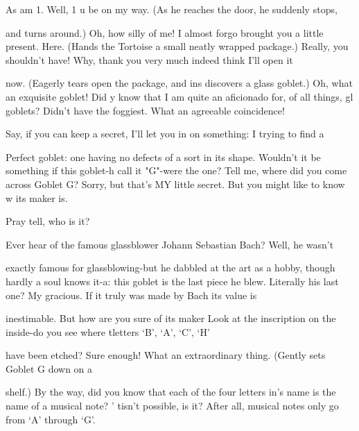 \achilles As am 1. Well, 1 u be on my way. (As he reaches the door, he suddenly stops,\par
and turns around.) Oh, how silly of me! I almost forgo brought you a little present. Here. (Hands the Tortoise a small neatly wrapped package.) 
\tortoise Really, you shouldn't have! Why, thank you very much indeed think I'll open it\par
now. (Eagerly tears open the package, and ins discovers a glass goblet.) Oh, what an exquisite goblet! Did y know that I am quite an aficionado for, of all things, gl goblets? 
\achilles Didn't have the foggiest. What an agreeable coincidence!\par

\tortoise Say, if you can keep a secret, I'll let you in on something: I trying to find a\par
Perfect goblet: one having no defects of a sort in its shape. Wouldn't it be something if this goblet-h call it "G"-were the one? Tell me, where did you come across Goblet G? 
\achilles Sorry, but that's MY little secret. But you might like to know w its maker is.\par

\tortoise Pray tell, who is it?\par

\achilles Ever hear of the famous glassblower Johann Sebastian Bach? Well, he wasn't\par
exactly famous for glassblowing-but he dabbled at the art as a hobby, though hardly a soul knows it-a: this goblet is the last piece he blew. 
\tortoise Literally his last one? My gracious. If it truly was made by Bach its value is\par
inestimable. But how are you sure of its maker 
\achilles Look at the inscription on the inside-do you see where tletters `B', `A', `C', `H'\par
have been etched? 
\tortoise Sure enough! What an extraordinary thing. (Gently sets Goblet G down on a\par
shelf.) By the way, did you know that each of the four letters in\Bach's name is the name of a musical note? 
\achilles ' tisn't possible, is it? After all, musical notes only go from ‘A’ through `G'.\par

